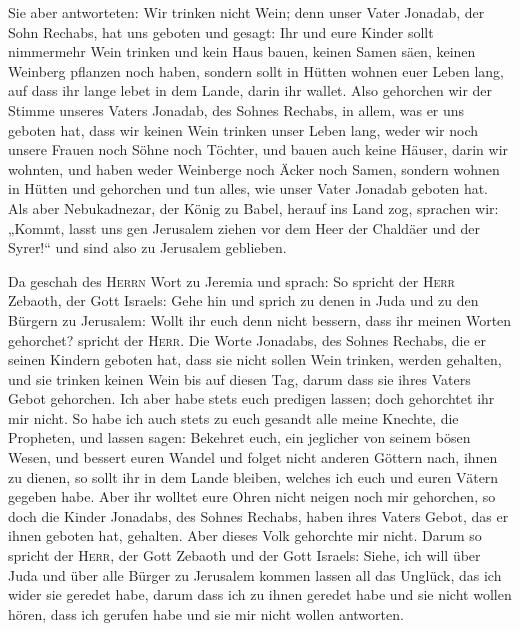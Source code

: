  Sie aber antworteten: Wir trinken nicht Wein; denn unser
Vater Jonadab, der Sohn Rechabs, hat uns geboten und gesagt: Ihr und
eure Kinder sollt nimmermehr Wein trinken  und kein Haus
bauen, keinen Samen säen, keinen Weinberg pflanzen noch haben, sondern
sollt in Hütten wohnen euer Leben lang, auf dass ihr lange lebet in dem
Lande, darin ihr wallet.  Also gehorchen wir der Stimme
unseres Vaters Jonadab, des Sohnes Rechabs, in allem, was er uns geboten
hat, dass wir keinen Wein trinken unser Leben lang, weder wir noch
unsere Frauen noch Söhne noch Töchter,  und bauen auch
keine Häuser, darin wir wohnten, und haben weder Weinberge noch Äcker
noch Samen,  sondern wohnen in Hütten und gehorchen und
tun alles, wie unser Vater Jonadab geboten hat.  Als aber
Nebukadnezar, der König zu Babel, herauf ins Land zog, sprachen wir:
„Kommt, lasst uns gen Jerusalem ziehen vor dem Heer der Chaldäer und der
Syrer!{}`` und sind also zu Jerusalem geblieben.

 Da geschah des \textsc{Herrn} Wort zu Jeremia und
sprach:  So spricht der \textsc{Herr} Zebaoth, der Gott
Israels: Gehe hin und sprich zu denen in Juda und zu den Bürgern zu
Jerusalem: Wollt ihr euch denn nicht bessern, dass ihr meinen Worten
gehorchet? spricht der \textsc{Herr}.  Die Worte
Jonadabs, des Sohnes Rechabs, die er seinen Kindern geboten hat, dass
sie nicht sollen Wein trinken, werden gehalten, und sie trinken keinen
Wein bis auf diesen Tag, darum dass sie ihres Vaters Gebot gehorchen.
Ich aber habe stets euch predigen lassen; doch gehorchtet ihr mir nicht.
 So habe ich auch stets zu euch gesandt alle meine
Knechte, die Propheten, und lassen sagen: Bekehret euch, ein jeglicher
von seinem bösen Wesen, und bessert euren Wandel und folget nicht
anderen Göttern nach, ihnen zu dienen, so sollt ihr in dem Lande
bleiben, welches ich euch und euren Vätern gegeben habe. Aber ihr
wolltet eure Ohren nicht neigen noch mir gehorchen,  so
doch die Kinder Jonadabs, des Sohnes Rechabs, haben ihres Vaters Gebot,
das er ihnen geboten hat, gehalten. Aber dieses Volk gehorchte mir
nicht.  Darum so spricht der \textsc{Herr}, der Gott
Zebaoth und der Gott Israels: Siehe, ich will über Juda und über alle
Bürger zu Jerusalem kommen lassen all das Unglück, das ich wider sie
geredet habe, darum dass ich zu ihnen geredet habe und sie nicht wollen
hören, dass ich gerufen habe und sie mir nicht wollen antworten.

